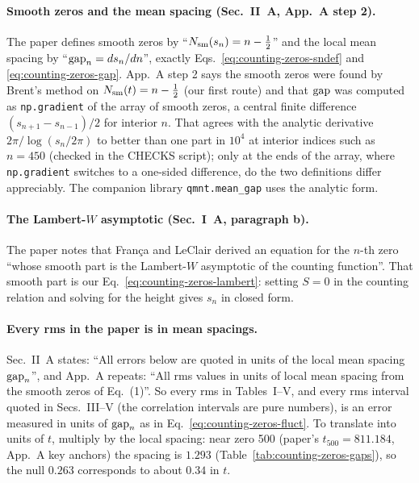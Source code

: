 \paragraph{Smooth zeros and the mean spacing (Sec.~II~A, App.~A step 2).} The paper defines smooth zeros by ``$N_{\mathrm{sm}}(s_n)=n-\tfrac12$'' and the local mean spacing by ``$\mathrm{gap}_n=ds_n/dn$'', exactly Eqs.~\eqref{eq:counting-zeros-sndef} and \eqref{eq:counting-zeros-gap}. App.~A step 2 says the smooth zeros were found by Brent's method on $N_{\mathrm{sm}}(t)=n-\tfrac12$ (our first route) and that $\mathrm{gap}$ was computed as \texttt{np.gradient} of the array of smooth zeros, a central finite difference $(s_{n+1}-s_{n-1})/2$ for interior $n$. That agrees with the analytic derivative $2\pi/\log(s_n/2\pi)$ to better than one part in $10^4$ at interior indices such as $n=450$ (checked in the CHECKS script); only at the ends of the array, where \texttt{np.gradient} switches to a one-sided difference, do the two definitions differ appreciably. The companion library \texttt{qmnt.mean\_gap} uses the analytic form.

\paragraph{The Lambert-$W$ asymptotic (Sec.~I~A, paragraph b).} The paper notes that Fran\c ca and LeClair \cite{francaleclair} derived an equation for the $n$-th zero ``whose smooth part is the Lambert-$W$ asymptotic of the counting function''. That smooth part is our Eq.~\eqref{eq:counting-zeros-lambert}: setting $S=0$ in the counting relation and solving for the height gives $s_n$ in closed form.

\paragraph{Every rms in the paper is in mean spacings.} Sec.~II~A states: ``All errors below are quoted in units of the local mean spacing $\mathrm{gap}_n$'', and App.~A repeats: ``All rms values in units of local mean spacing from the smooth zeros of Eq.~(1)''. So every rms in Tables~I--V, and every rms interval quoted in Secs.~III--V (the correlation intervals are pure numbers), is an error measured in units of $\mathrm{gap}_n$ as in Eq.~\eqref{eq:counting-zeros-fluct}. To translate into units of $t$, multiply by the local spacing: near zero 500 (paper's $t_{500}=811.184$, App.~A key anchors) the spacing is $1.293$ (Table~\ref{tab:counting-zeros-gaps}), so the null $0.263$ corresponds to about $0.34$ in $t$.

